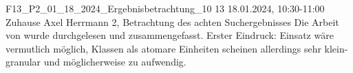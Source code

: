 \fieldnote
{F13\_P2\_01\_18\_2024\_Ergebnisbetrachtung\_10}
{13}
{18.01.2024, 10:30-11:00}
{Zuhause}
{Axel Herrmann}
{2, Betrachtung des achten Suchergebnisses}
{
  Die Arbeit von  wurde durchgelesen und zusammengefasst.
}
{
}
{
}
{}
{
  Erster Eindruck: Einsatz wäre vermutlich möglich, Klassen als atomare Einheiten scheinen allerdings sehr klein-granular und möglicherweise zu aufwendig.
}
